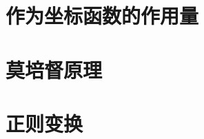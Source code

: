\documentclass[11pt,a4paper]{article}
\begin{document}
\section{作为坐标函数的作用量}







\section{莫培督原理}





\section{正则变换}
\end{document}
